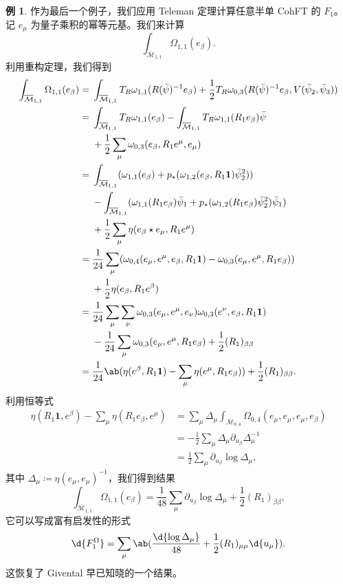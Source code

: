 \documentclass{amsart}
\theoremstyle{definition}
\newtheorem{exm}[thm]{例}
\theoremstyle{remark}
\theoremstyle{plain}
\theoremstyle{definition}
\theoremstyle{remark}
\newcommand{\Mbar}{\overline{\mathcal{M}}}
\newcommand{\1}{\mathbf{1}}
\newcommand{\2}{\mathbf{2}}
\newcommand{\3}{\mathbf{3}}
\begin{document}
\begin{exm}
    作为最后一个例子，我们应用 Teleman 定理计算任意半单 CohFT 的 $F_1$。记 $e_{\mu}$ 为量子乘积的幂等元基。我们来计算
    \[ \int_{\Mbar_{1,1}} \Omega_{1,1}(e_{\beta}). \]
    利用重构定理，我们得到
    \begin{align*}
        \int_{\Mbar_{1,1}}\Omega_{1,1}(e_{\beta}) ={}& \int_{\Mbar_{1,1}} T_R \omega_{1,1}(R(\bar{\psi})^{-1} e_{\beta}) + \frac{1}{2} T_R \omega_{0,3}(R(\bar{\psi})^{-1} e_{\beta}, V(\bar{\psi}_2, \bar{\psi}_3)) \\
        ={}& \int_{\Mbar_{1,1}}T_R\omega_{1,1}(e_{\beta}) - \int_{\Mbar_{1,1}} T_R \omega_{1,1}(R_1 e_{\beta})\bar{\psi} \\
        &+ \frac{1}{2}\sum_{\mu}  \omega_{0,3}(e_{\beta}, R_1 e^{\mu}, e_{\mu}) \\
        ={}& \int_{\Mbar_{1,1}} ( \omega_{1,1}(e_{\beta}) + p_* ( \omega_{1,2}(e_{\beta}, R_1 \1) \bar{\psi}_2^2 )) \\
        &- \int_{\Mbar_{1,1}} (\omega_{1,1}(R_1 e_{\beta})\bar{\psi}_1 + p_* ( \omega_{1,2}(R_1 e_{\beta}) \bar{\psi}_2^2 ) \bar{\psi}_1) \\
        &+ \frac{1}{2} \sum_{\mu} \eta(e_{\beta} \star e_{\mu}, R_1 e^{\mu}) \\
        ={}& \frac{1}{24} \sum_{\mu} ( \omega_{0,4}(e_{\mu}, e^{\mu}, e_{\beta}, R_1 \1) -\omega_{0,3}(e_{\mu}, e^{\mu}, R_1 e_{\beta}) )\\
        &+ \frac{1}{2} \eta(e_{\beta}, R_1 e^{\beta}) \\
        ={}& \frac{1}{24} \sum_{\mu}\sum_{\nu} \omega_{0,3}(e_{\mu}, e^{\mu}, e_{\nu})\omega_{0,3}(e^{\nu}, e_{\beta}, R_1 \1) \\
        &-\frac{1}{24} \sum_{\mu} \omega_{0,3}(e_{\mu}, e^{\mu}, R_1 e_{\beta}) + \frac{1}{2} (R_1)_{\beta\beta} \\
        ={}& \frac{1}{24} \ab(\eta(e^{\beta}, R_1 \1) - \sum_{\mu} \eta(e^{\mu}, R_1 e_{\beta})) + \frac{1}{2} (R_1)_{\beta\beta}.
    \end{align*}
    利用恒等式
    \begin{align*}
        \eta(R_1 \1, e^{\beta}) - \sum_{\mu} \eta(R_1 e_{\beta}, e^{\mu}) &= \sum_{\mu} \Delta_{\mu} \int_{\Mbar_{0,4}} \Omega_{0,4}(e_{\mu}, e_{\mu}, e_{\mu}, e_{\beta}) \\
        &= -\frac{1}{2}\sum_{\mu} \Delta_{\mu} \partial_{u_{\beta}} \Delta_{\mu}^{-1} \\
        &= \frac{1}{2} \sum_{\mu} \partial_{u_{\beta}} \log \Delta_{\mu},
    \end{align*}
    其中 $\Delta_{\mu} \coloneqq \eta(e_{\mu}, e_{\mu})^{-1}$，我们得到结果
    \[ \int_{\Mbar_{1,1}} \Omega_{1,1}(e_{\beta}) = \frac{1}{48} \sum_{\mu} \partial_{u_{\beta}} \log \Delta_{\mu} + \frac{1}{2} (R_1)_{\beta\beta}, \]
    它可以写成富有启发性的形式
    \[ \d{F_1^{\Omega}} = \sum_{\mu} \ab( \frac{\d{\log \Delta_{\mu}}}{48} + \frac{1}{2} (R_1)_{\mu\mu} \d{u_{\mu}} ). \]
    这恢复了 Givental 早已知晓的一个结果。
\end{exm}
\end{document}
